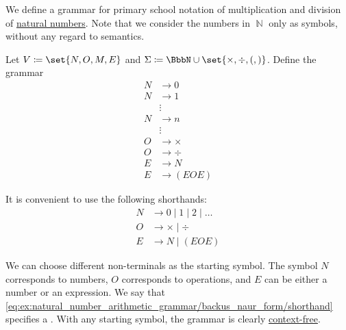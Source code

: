 \begin{example}\label{ex:natural_number_arithmetic_grammar/backus_naur_form}
  We define a grammar for primary school notation of multiplication and division of \hyperref[def:natural_numbers]{natural numbers}. Note that we consider the numbers in \( \BbbN \) only as symbols, without any regard to semantics.

  Let \( V \coloneqq \set{ N, O, M, E } \) and \( \Sigma \coloneqq \BbbN \cup \set{ \times, \div, (, ) } \). Define the grammar
  \begin{equation}\label{eq:ex:natural_number_arithmetic_grammar/backus_naur_form/simple}
    \begin{aligned}
      N &\to 0 \\
      N &\to 1 \\
      \phantom{N} &\vdots \\
      N &\to n \\
      \phantom{N} &\vdots \\
      O &\to \times \\
      O &\to \div \\
      E &\to N \\
      E &\to (E O E)
    \end{aligned}
  \end{equation}

  It is convenient to use the following shorthands:
  \begin{equation}\label{eq:ex:natural_number_arithmetic_grammar/backus_naur_form/shorthand}
    \begin{aligned}
      N &\to 0 \mid 1 \mid 2 \mid \ldots \\
      O &\to \times \mid \div \\
      E &\to N \mid (E O E)
    \end{aligned}
  \end{equation}

  We can choose different non-terminals as the starting symbol. The symbol \( N \) corresponds to numbers, \( O \) corresponds to operations, and \( E \) can be either a number or an expression. We say that \eqref{eq:ex:natural_number_arithmetic_grammar/backus_naur_form/shorthand} specifies a . With any starting symbol, the grammar is clearly \hyperref[def:chomsky_hierarchy]{context-free}.
\end{example}

